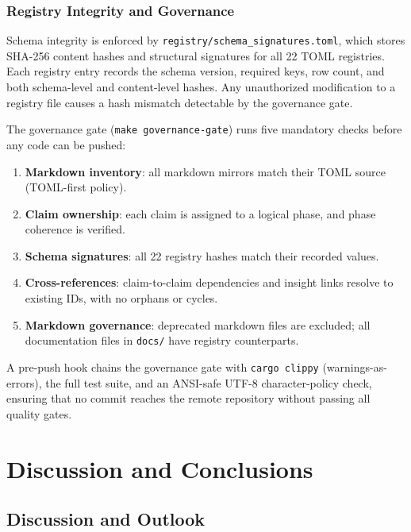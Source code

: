 \documentclass[12pt,openany]{report}
\theoremstyle{definition}
\theoremstyle{plain}
\theoremstyle{remark}
\begin{document}
\section{Registry Integrity and Governance}

Schema integrity is enforced by
\texttt{registry/schema\_signatures.toml}, which stores SHA-256 content
hashes and structural signatures for all 22 TOML registries.  Each
registry entry records the schema version, required keys, row count,
and both schema-level and content-level hashes.  Any unauthorized
modification to a registry file causes a hash mismatch detectable by
the governance gate.

The governance gate (\texttt{make governance-gate}) runs five mandatory
checks before any code can be pushed:
\begin{enumerate}
  \item \textbf{Markdown inventory}: all markdown mirrors match their
    TOML source (TOML-first policy).
  \item \textbf{Claim ownership}: each claim is assigned to a logical
    phase, and phase coherence is verified.
  \item \textbf{Schema signatures}: all 22 registry hashes match their
    recorded values.
  \item \textbf{Cross-references}: claim-to-claim dependencies and
    insight links resolve to existing IDs, with no orphans or cycles.
  \item \textbf{Markdown governance}: deprecated markdown files are
    excluded; all documentation files in \texttt{docs/} have registry
    counterparts.
\end{enumerate}
A pre-push hook chains the governance gate with \texttt{cargo clippy}
(warnings-as-errors), the full test suite, and an ANSI-safe UTF-8 character-policy check,
ensuring that no commit reaches the remote repository without passing
all quality gates.


\part{Discussion and Conclusions}
\label{part:framing}

\chapter{Discussion and Outlook}
\label{ch:discussion}
\end{document}
